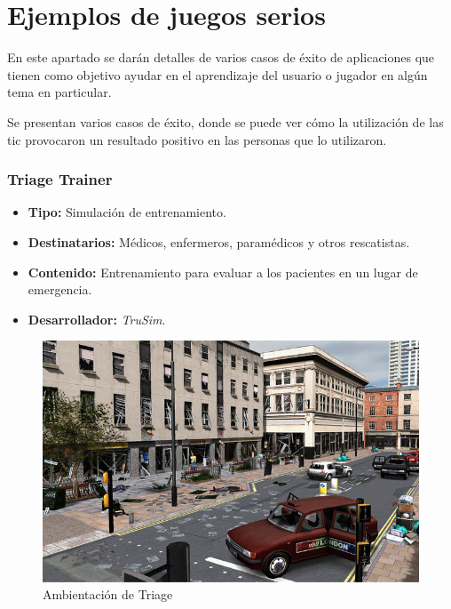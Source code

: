 \section[Ejemplos]{Ejemplos de juegos serios}

En este apartado se darán detalles de varios casos de éxito de aplicaciones que
tienen como objetivo ayudar en el aprendizaje del usuario o jugador en algún
tema en particular.

Se presentan varios casos de éxito, donde se puede ver cómo la utilización de
las \Gls{tic} provocaron un resultado positivo en las personas que lo
utilizaron.

\subsubsection{Triage Trainer}

\begin{itemize}
\item \textbf{Tipo:} Simulación de entrenamiento.
\item \textbf{Destinatarios:} Médicos, enfermeros, paramédicos y otros
    rescatistas.
\item \textbf{Contenido:} Entrenamiento para evaluar a los pacientes en un lugar de
  emergencia.
\item \textbf{Desarrollador:} \emph{TruSim}.
\end{itemize}

\begin{figure}[ht!] 
\centering 
\includegraphics[scale=0.5]{tics/images/triage.png}
\caption{Ambientación de Triage}
\label{fig:triage}
\end{figure}

